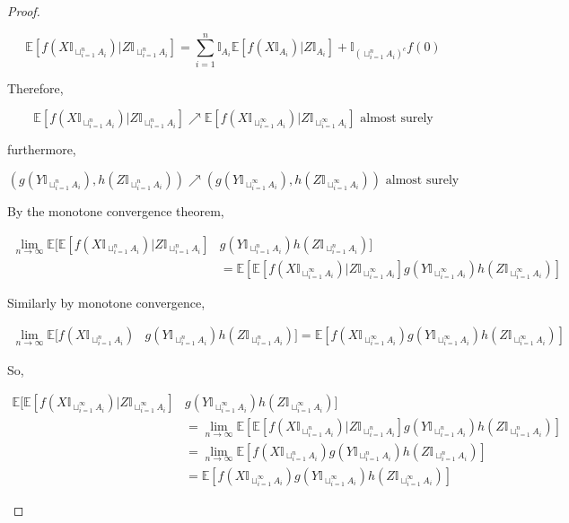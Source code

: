 \documentclass[12pt]{article}
\newcommand{\mb}{\mathbb}
\newcommand{\ra}{\rightarrow}
\newcommand{\te}{\text}
\newcommand{\ex}[1]{\mb{E}\left[#1\right]}			%
\newcommand{\X}{X}								%
\newcommand{\indx}[1]{_{#1}}					%
\newcommand{\XX}{Y}								%
\newcommand{\XXX}{Z}							%
\newcommand{\typset}{A}							%
\begin{document}
\begin{proof}
\begin{enumerate}[(a)]
\[\ex{f(\X\mb{I}_{\sqcup_{i=1}^n \typset\indx{i}})|\XXX\mb{I}_{\sqcup_{i=1}^n \typset\indx{i}}} = \sum_{i=1}^n \mb{I}_{\typset\indx{i}}\ex{f(\X\mb{I}_{\typset\indx{i}})|\XXX\mb{I}_{\typset\indx{i}}} + \mb{I}_{\left(\sqcup_{i=1}^n \typset\indx{i}\right)^c} f(0)\]

Therefore,

\[\ex{f(\X\mb{I}_{\sqcup_{i=1}^n \typset\indx{i}})|\XXX\mb{I}_{\sqcup_{i=1}^n \typset\indx{i}}} \nearrow \ex{f(\X\mb{I}_{\sqcup_{i=1}^\infty \typset\indx{i}})|\XXX\mb{I}_{\sqcup_{i=1}^\infty \typset\indx{i}}} \te{ almost surely}\]

furthermore, 

\[(g(\XX\mb{I}_{\sqcup_{i=1}^n \typset\indx{i}}),h(\XXX\mb{I}_{\sqcup_{i=1}^n \typset\indx{i}})) \nearrow (g(\XX\mb{I}_{\sqcup_{i=1}^\infty \typset\indx{i}}),h(\XXX\mb{I}_{\sqcup_{i=1}^\infty  \typset\indx{i}})) \te{ almost surely}\]

By the monotone convergence theorem,

\begin{align*}
\lim_{n\ra\infty} \mb{E}\bigg[\ex{f(\X\mb{I}_{\sqcup_{i=1}^n \typset\indx{i}})|\XXX\mb{I}_{\sqcup_{i=1}^n \typset\indx{i}}}&g(\XX\mb{I}_{\sqcup_{i=1}^n \typset\indx{i}})h(\XXX\mb{I}_{\sqcup_{i=1}^n \typset\indx{i}})\bigg]\\
& = \ex{\ex{f(\X\mb{I}_{\sqcup_{i=1}^\infty \typset\indx{i}})|\XXX\mb{I}_{\sqcup_{i=1}^\infty \typset\indx{i}}}g(\XX\mb{I}_{\sqcup_{i=1}^\infty \typset\indx{i}})h(\XXX\mb{I}_{\sqcup_{i=1}^\infty \typset\indx{i}})}
\end{align*}

Similarly by monotone convergence,

\begin{align*}
\lim_{n\ra\infty} \mb{E}\bigg[f(\X\mb{I}_{\sqcup_{i=1}^n \typset\indx{i}})&g(\XX\mb{I}_{\sqcup_{i=1}^n \typset\indx{i}})h(\XXX\mb{I}_{\sqcup_{i=1}^n \typset\indx{i}})\bigg] = \ex{f(\X\mb{I}_{\sqcup_{i=1}^\infty \typset\indx{i}})g(\XX\mb{I}_{\sqcup_{i=1}^\infty \typset\indx{i}})h(\XXX\mb{I}_{\sqcup_{i=1}^\infty \typset\indx{i}})}
\end{align*}

So,

\begin{align*}
\mb{E}\bigg[\ex{f(\X\mb{I}_{\sqcup_{i=1}^\infty \typset\indx{i}})|\XXX\mb{I}_{\sqcup_{i=1}^\infty \typset\indx{i}}}&g(\XX\mb{I}_{\sqcup_{i=1}^\infty \typset\indx{i}})h(\XXX\mb{I}_{\sqcup_{i=1}^\infty \typset\indx{i}})\bigg]\\
&= \lim_{n\ra\infty} \ex{\ex{f(\X\mb{I}_{\sqcup_{i=1}^n \typset\indx{i}})|\XXX\mb{I}_{\sqcup_{i=1}^n \typset\indx{i}}}g(\XX\mb{I}_{\sqcup_{i=1}^n \typset\indx{i}})h(\XXX\mb{I}_{\sqcup_{i=1}^n \typset\indx{i}})}\\
&= \lim_{n\ra\infty} \ex{f(\X\mb{I}_{\sqcup_{i=1}^n \typset\indx{i}})g(\XX\mb{I}_{\sqcup_{i=1}^n \typset\indx{i}})h(\XXX\mb{I}_{\sqcup_{i=1}^n \typset\indx{i}})}\\
&= \ex{f(\X\mb{I}_{\sqcup_{i=1}^\infty \typset\indx{i}})g(\XX\mb{I}_{\sqcup_{i=1}^\infty \typset\indx{i}})h(\XXX\mb{I}_{\sqcup_{i=1}^\infty \typset\indx{i}})}
\end{align*}


\end{enumerate}
\end{proof}
\end{document}
